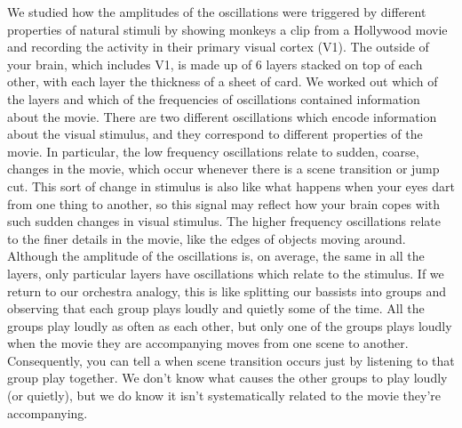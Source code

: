 We studied how the amplitudes of the oscillations were triggered by different properties of natural stimuli by showing monkeys a clip from a Hollywood movie and recording the activity in their primary visual cortex (\acs{V1}).
The outside of your brain, which includes \acs{V1}, is made up of \num{6} layers stacked on top of each other, with each layer the thickness of a sheet of card.
We worked out which of the layers and which of the frequencies of oscillations contained information about the movie.
There are two different oscillations which encode information about the visual stimulus, and they correspond to different properties of the movie.
In particular, the low frequency oscillations relate to sudden, coarse, changes in the movie, which occur whenever there is a scene transition or jump cut.
This sort of change in stimulus is also like what happens when your eyes dart from one thing to another, so this signal may reflect how your brain copes with such sudden changes in visual stimulus.
The higher frequency oscillations relate to the finer details in the movie, like the edges of objects moving around.
Although the amplitude of the oscillations is, on average, the same in all the layers, only particular layers have oscillations which relate to the stimulus.
If we return to our orchestra analogy, this is like splitting our bassists into groups and observing that each group plays loudly and quietly some of the time.
All the groups play loudly as often as each other, but only one of the groups plays loudly when the movie they are accompanying moves from one scene to another.
Consequently, you can tell a when scene transition occurs just by listening to that group play together.
We don't know what causes the other groups to play loudly (or quietly), but we do know it isn't systematically related to the movie they're accompanying.

\endgroup
